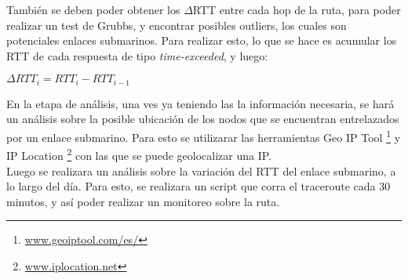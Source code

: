 También se deben poder obtener los $\Delta$RTT entre cada hop de la ruta, para poder realizar un test de Grubbs, y encontrar posibles outliers, los cuales son potenciales enlaces submarinos. Para realizar esto, lo que se hace es acumular los RTT de cada respuesta de tipo \textit{time-exceeded}, y luego:

\begin{center}
	$\Delta RTT_i = RTT_i - RTT_{i-1} $
\end{center}

En la etapa de análisis, una ves ya teniendo las la información necesaria, se hará un análisis sobre la posible ubicación de los nodos que se encuentran entrelazados por un enlace submarino. Para esto se utilizarar las herramientas Geo IP Tool \footnote{\url{www.geoiptool.com/es/}} y IP Location \footnote{\url{www.iplocation.net}} con las que se puede geolocalizar una IP.\\

Luego se realizara un análisis sobre la variación del RTT del enlace submarino, a lo largo del día. Para esto, se realizara un script que corra el traceroute cada 30 minutos, y así poder realizar un monitoreo sobre la ruta.

